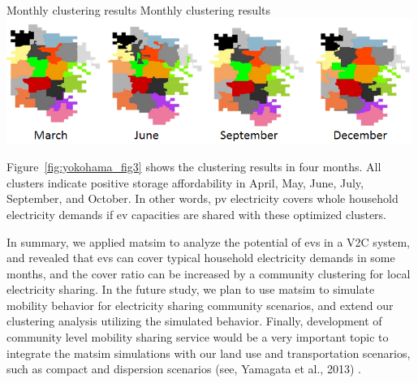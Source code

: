 {}
%
\createfigure%
{Monthly clustering results}%
{Monthly clustering results}%
{\label{fig:yokohama_fig3}}%
{\includegraphics[width=0.99\textwidth, angle=0]{./scenarios/figures/yokohama_fig3.png}}%
{}

Figure~\ref{fig:yokohama_fig3} shows the clustering results in four months. All clusters indicate positive storage affordability in April, May, June, July, September, and October. In other words, \gls{pv} electricity covers whole household electricity demands if \gls{ev} capacities are shared with these optimized clusters.

In summary, we applied \gls{matsim} to analyze the potential of \glspl{ev} in a V2C system, and revealed that \glspl{ev} can cover typical household electricity demands in some months, and the cover ratio can be increased by a community clustering for local electricity sharing. In the future study, we plan to use \gls{matsim} to simulate mobility behavior for electricity sharing community scenarios, and extend our clustering analysis utilizing the simulated behavior. Finally, development of community level mobility sharing service would be a very important topic to integrate the \gls{matsim} simulations with our land use and transportation scenarios, such as compact and dispersion scenarios (see, Yamagata et al., 2013) \citep[][]{}.

